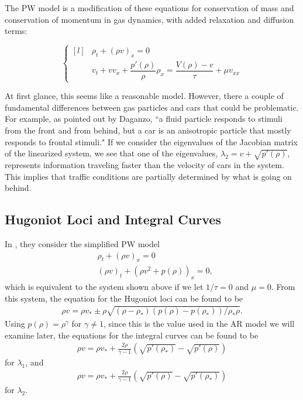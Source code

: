 \documentclass{article}
\begin{document}
The PW model is a modification of these equations for conservation of mass and conservation of momentum in gas dynamics, with added relaxation and diffusion terms: 

\[ \left\{ \begin{matrix*}[l] & \rho_t + (\rho v)_x = 0 \\[1ex] & v_t + v v_x + \dfrac{p'(\rho)}{\rho} \rho_x = \dfrac{V(\rho) - v}{\tau} + \mu v_{xx} \end{matrix*} \right. \]

At first glance, this seems like a reasonable model.  However, there a couple of fundamental differences between gas particles and cars that could be problematic.  For example, as pointed out by Daganzo, ``a fluid particle responds to stimuli from the front and from behind, but a car is an anisotropic particle that mostly responds to frontal stimuli."  If we consider the eigenvalues of the Jacobian matrix of the linearized system, we see that one of the eigenvalues, $\lambda_2 = v + \sqrt{p'(\rho)}$, represents information traveling faster than the velocity of cars in the system.  This implies that traffic conditions are partially determined by what is going on behind.

\subsection{Hugoniot Loci and Integral Curves}
In \cite{AwRascle2000}, they consider the simplified PW model
\begin{align*}
&\rho_t + \left( \rho v\right)_x = 0 \\
&\left( \rho v\right)_t + \left( \rho v^2 + p(\rho )\right)_x = 0,
\end{align*}
which is equivalent to the system shown above if we let $1/\tau = 0$ and $\mu = 0$.
From this system, the equation for the Hugoniot loci can be found to be
\begin{align*}
\rho v = \rho v_* \pm \rho \sqrt{\left( \rho - \rho_*\right) \left( p(\rho ) - p(\rho_*)\right) / \rho_*\rho }.
\end{align*}
Using $p(\rho) = \rho^{\gamma}$ for $\gamma \neq 1$, since this is the value used in the AR model we will examine later, the equations for the integral curves can be found to be
\begin{align*}
\rho v = \rho v_* + \frac{2 \rho}{\gamma - 1}\left( \sqrt{p'(\rho_*)} - \sqrt{p'(\rho)}\right)
\end{align*}
for $\lambda_1$, and 
\begin{align*}
\rho v = \rho v_* + \frac{2 \rho}{\gamma - 1}\left( \sqrt{p'(\rho)} - \sqrt{p'(\rho_*)} \right)
\end{align*}
for $\lambda_2$.
\end{document}
